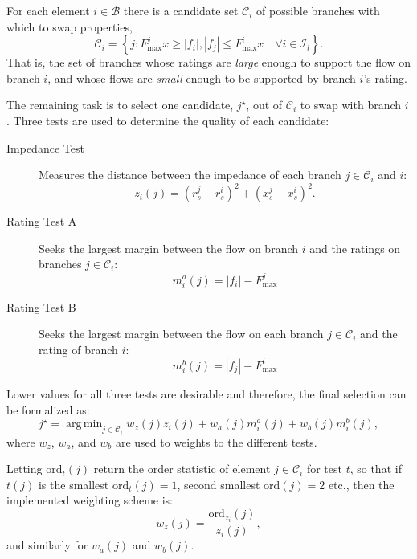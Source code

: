 \documentclass[12pt]{article}
\DeclareMathOperator*{\argmin}{arg\,min} %
\numberwithin{equation}{section}
\numberwithin{table}{section}
\numberwithin{figure}{section}
\begin{document}
For each element $i\in\mathcal{B}$ there is a candidate set $\mathcal{C}_i$ of possible branches with which to swap properties,
\begin{equation}
	\mathcal{C}_i = \left\{j: F_{\text{max}}^j x\geq |f_i|, |f_j| \leq F^i_{\text{max}} x \quad \forall i \in \mathcal{I}_l\right\}.
\end{equation}
That is, the set of branches whose ratings are \emph{large} enough to support the flow on branch $i$, and whose flows are \emph{small} enough to be supported by branch $i$'s rating.

The remaining task is to select one candidate, $j^{\star}$, out of $\mathcal{C}_i$ to swap with branch $i$.
Three tests are used to determine the quality of each candidate:
\begin{description}
\item[Impedance Test] Measures the distance between the impedance of each branch ${j\in\mathcal{C}_{i}}$ and $i$:
\begin{equation}
	z_{i}(j) = (r^j_s - r^i_s)^2 + (x^j_s - x^i_s)^2.
\end{equation}
\item[Rating Test A] Seeks the largest margin between the flow on branch $i$ and the ratings on branches ${j\in\mathcal{C}_{i}}$:
\begin{equation}
	m^a_{i}(j) = |f_i| - F_{\text{max}}^j
\end{equation} 
\item[Rating Test B] Seeks the largest margin between the flow on each branch ${j\in\mathcal{C}_{i}}$ and the rating of branch $i$:
\begin{equation}
	m^b_{i}(j) = |f_{j}| - F_{\text{max}}^i
\end{equation}
\end{description}
Lower values for all three tests are desirable and therefore, the final selection can be formalized as:
\begin{equation}
	j^{\star} = \argmin_{j\in\mathcal{C}_{i}} w_z(j) z_{i}(j) + w_a(j) m^a_{i}(j) + w_b(j) m^b_{i}(j),
\end{equation}
where $w_z$, $w_a$, and $w_b$ are used to weights to the different tests.

Letting $\text{ord}_t(j)$ return the order statistic of element $j\in\mathcal{C}_{i}$ for test $t$, so that if $t(j)$ is the smallest $\text{ord}_t(j) = 1$, second smallest $\text{ord}(j)=2$ etc., then the implemented weighting scheme is:
\begin{equation}
	w_z(j) = \frac{\text{ord}_{z_{i}}(j)}{z_{i}(j)},
\end{equation}
and similarly for $w_a(j)$ and $w_b(j)$.
\end{document}
